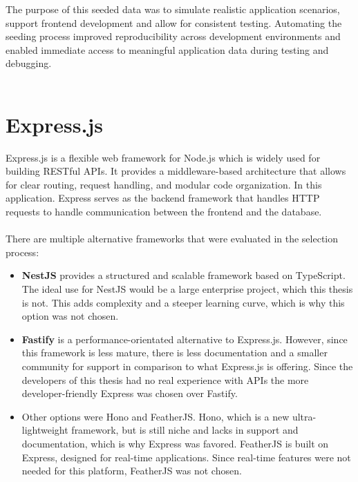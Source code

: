 \documentclass[a4paper,12pt]{report}
\begin{document}
The purpose of this seeded data was to simulate realistic application scenarios, support frontend development and allow for consistent testing. Automating the seeding process improved reproducibility across development environments and enabled immediate access to meaningful application data during testing and debugging. \\ \\

\section{Express.js}
Express.js is a flexible web framework for Node.js which is widely used for building RESTful APIs. It provides a middleware-based architecture that allows for clear routing, request handling, and modular code organization. In this application. Express serves as the backend framework that handles HTTP requests to handle communication between the frontend and the database. \cite{expr-base} \\ \\
There are multiple alternative frameworks that were evaluated in the selection process:
\begin{itemize}
	\item \textbf{NestJS} provides a structured and scalable framework based on TypeScript. The ideal use for NestJS would be a large enterprise project, which this thesis is not. This adds complexity and a steeper learning curve, which is why this option was not chosen. \cite{expr-comp} \cite{expr-comp2} \cite{nest-js}
	\item \textbf{Fastify} is a performance-orientated alternative to Express.js. However, since this framework is less mature, there is less documentation and a smaller community for support in comparison to what Express.js is offering. Since the developers of this thesis had no real experience with APIs the more developer-friendly Express was chosen over Fastify. \cite{expr-comp} \cite{expr-comp2}
	\item Other options were Hono and FeatherJS. Hono, which is a new ultra-lightweight framework, but is still niche and lacks in support and documentation, which is why Express was favored. FeatherJS is built on Express, designed for real-time applications. Since real-time features were not needed for this platform, FeatherJS was not chosen. \cite{expr-comp} \cite{expr-comp2} \\
\end{itemize}
\end{document}
